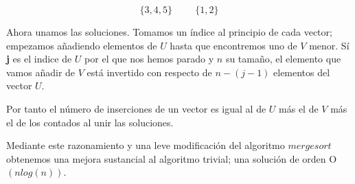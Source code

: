$$\{3,4,5\} \hspace{1cm} \{1,2\}$$

Ahora unamos las soluciones. Tomamos un índice al principio de cada vector; empezamos añadiendo elementos de $U$ hasta que encontremos uno de $V$ menor. Sí \textbf{j} es el indice de $U$ por el que nos hemos parado y $n$ su tamaño, el elemento que vamos añadir de $V$ está invertido con respecto de $n-(j-1)$ elementos del vector $U$.

Por tanto el número de inserciones de un vector es igual al de $U$ más el de $V$ más el de los contados al unir las soluciones. 


Mediante este razonamiento y una leve modificación del algoritmo $mergesort$ obtenemos una mejora sustancial al algoritmo trivial; una solución de orden O$(nlog(n))$.
